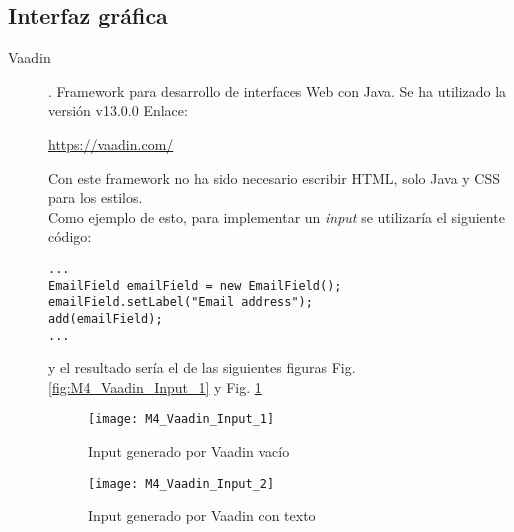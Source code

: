 \subsection{Interfaz gráfica}
\begin{description}
	\item[Vaadin]. Framework para desarrollo de interfaces Web con Java.
		Se ha utilizado la versión  v13.0.0 Enlace:
		
		\url{https://vaadin.com/}
		
		Con este framework no ha sido necesario escribir HTML, solo Java y CSS para los estilos. 
		\\Como ejemplo de esto, para implementar un \textit{input} se utilizaría el siguiente código:
		
\begin{minipage}{\linewidth}
\tiny \begin{verbatim}
...
EmailField emailField = new EmailField();
emailField.setLabel("Email address");
add(emailField);
...
\end{verbatim}
\end{minipage}	

		y el resultado sería el de las siguientes figuras Fig. \ref{fig:M4_Vaadin_Input_1} y Fig. \ref{fig:M4_Vaadin_Input_2}
\begin{figure}[!h]
	\centering
	\texttt{[image: M4\_Vaadin\_Input\_1]}
	\caption{Input generado por Vaadin vacío}\label{fig:M4_Vaadin_Input_1}
	
	
	\texttt{[image: M4\_Vaadin\_Input\_2]}
	\caption{Input generado por Vaadin con texto}\label{fig:M4_Vaadin_Input_2}
\end{figure}
\FloatBarrier

\end{description}

